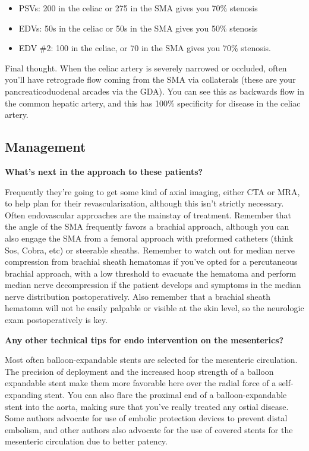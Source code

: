 \documentclass[
]{book}
\begin{document}
\begin{itemize}
\item
  PSVs: 200 in the celiac or 275 in the SMA gives you 70\% stenosis
\item
  EDVs: 50s in the celiac or 50s in the SMA gives you 50\% stenosis
\item
  EDV \#2: 100 in the celiac, or 70 in the SMA gives you 70\% stenosis.
\end{itemize}

Final thought. When the celiac artery is severely narrowed or occluded,
often you'll have retrograde flow coming from the SMA via collaterals
(these are your pancreaticoduodenal arcades via the GDA). You can see
this as backwards flow in the common hepatic artery, and this has 100\%
specificity for disease in the celiac artery.

\hypertarget{management-5}{%
\subsection{Management}\label{management-5}}

\textbf{What's next in the approach to these patients?}

Frequently they're going to get some kind of axial imaging, either CTA
or MRA, to help plan for their revascularization, although this isn't
strictly necessary. Often endovascular approaches are the mainstay of
treatment. Remember that the angle of the SMA frequently favors a
brachial approach, although you can also engage the SMA from a femoral
approach with preformed catheters (think Sos, Cobra, etc) or steerable
sheaths. Remember to watch out for median nerve compression from
brachial sheath hematomas if you've opted for a percutaneous brachial
approach, with a low threshold to evacuate the hematoma and perform
median nerve decompression if the patient develops and symptoms in the
median nerve distribution postoperatively. Also remember that a brachial
sheath hematoma will not be easily palpable or visible at the skin
level, so the neurologic exam postoperatively is key.

\textbf{Any other technical tips for endo intervention on the mesenterics?}

Most often balloon-expandable stents are selected for the mesenteric
circulation. The precision of deployment and the increased hoop strength
of a balloon expandable stent make them more favorable here over the
radial force of a self-expanding stent. You can also flare the proximal
end of a balloon-expandable stent into the aorta, making sure that
you've really treated any ostial disease. Some authors advocate for use
of embolic protection devices to prevent distal embolism, and other
authors also advocate for the use of covered stents for the mesenteric
circulation due to better patency.~
\end{document}
